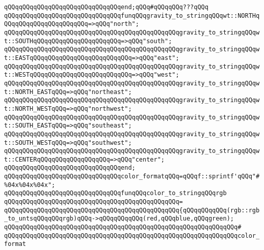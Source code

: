 \verb|qQQqqQQqqQQqqQQqqQQqqQQqqQQqqQQqend;qQQq#qQQqqQQq???qQQq|\newline
\newline
\verb|qQQqqQQqqQQqqQQqqQQqqQQqqQQqqQQqfunqQQqgravity_to_stringqQQqwt::NORTHqQQqqQQqqQQqqQQqqQQqqQQq=>qQQq"north";|\newline
\verb|qQQqqQQqqQQqqQQqqQQqqQQqqQQqqQQqqQQqqQQqqQQqqQQqgravity_to_stringqQQqwt::SOUTHqQQqqQQqqQQqqQQqqQQqqQQq=>qQQq"south";|\newline
\verb|qQQqqQQqqQQqqQQqqQQqqQQqqQQqqQQqqQQqqQQqqQQqqQQqgravity_to_stringqQQqwt::EASTqQQqqQQqqQQqqQQqqQQqqQQqqQQq=>qQQq"east";|\newline
\verb|qQQqqQQqqQQqqQQqqQQqqQQqqQQqqQQqqQQqqQQqqQQqqQQqgravity_to_stringqQQqwt::WESTqQQqqQQqqQQqqQQqqQQqqQQqqQQq=>qQQq"west";|\newline
\verb|qQQqqQQqqQQqqQQqqQQqqQQqqQQqqQQqqQQqqQQqqQQqqQQqgravity_to_stringqQQqwt::NORTH_EASTqQQq=>qQQq"northeast";|\newline
\verb|qQQqqQQqqQQqqQQqqQQqqQQqqQQqqQQqqQQqqQQqqQQqqQQqgravity_to_stringqQQqwt::NORTH_WESTqQQq=>qQQq"northwest";|\newline
\verb|qQQqqQQqqQQqqQQqqQQqqQQqqQQqqQQqqQQqqQQqqQQqqQQqgravity_to_stringqQQqwt::SOUTH_EASTqQQq=>qQQq"southeast";|\newline
\verb|qQQqqQQqqQQqqQQqqQQqqQQqqQQqqQQqqQQqqQQqqQQqqQQqgravity_to_stringqQQqwt::SOUTH_WESTqQQq=>qQQq"southwest";|\newline
\verb|qQQqqQQqqQQqqQQqqQQqqQQqqQQqqQQqqQQqqQQqqQQqqQQqgravity_to_stringqQQqwt::CENTERqQQqqQQqqQQqqQQqqQQq=>qQQq"center";|\newline
\verb|qQQqqQQqqQQqqQQqqQQqqQQqqQQqqQQqend;|\newline
\newline
\verb|qQQqqQQqqQQqqQQqqQQqqQQqqQQqqQQqcolor_formatqQQq=qQQqf::sprintf'qQQq"#%04x%04x%04x";|\newline
\newline
\verb|qQQqqQQqqQQqqQQqqQQqqQQqqQQqqQQqfunqQQqcolor_to_stringqQQqrgb|\newline
\verb|qQQqqQQqqQQqqQQqqQQqqQQqqQQqqQQqqQQqqQQqqQQqqQQq=|\newline
\verb|qQQqqQQqqQQqqQQqqQQqqQQqqQQqqQQqqQQqqQQqqQQqqQQq{qQQqqQQqqQQq(rgb::rgb_to_untsqQQqqQQqrgb)qQQq->qQQqqQQqqQQq(red,qQQqblue,qQQqgreen);|\newline
\verb|qQQqqQQqqQQqqQQqqQQqqQQqqQQqqQQqqQQqqQQqqQQqqQQqqQQqqQQqqQQqqQQq#|\newline
\verb|qQQqqQQqqQQqqQQqqQQqqQQqqQQqqQQqqQQqqQQqqQQqqQQqqQQqqQQqqQQqqQQqcolor_format|\newline

